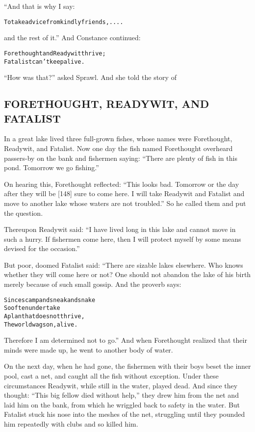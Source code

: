\documentclass{article}
\renewenvironment{verbatim}{\begin{alltt}\normalfont\begin{centering}}{\end{centering}\end{alltt}}
\begin{document}
“And that is why I say:

\begin{verbatim}
To take advice from kindly friends, ....
\end{verbatim}
and the rest of it.” And Constance continued:

\begin{verbatim}
Forethought and Ready wit thrive;
Fatalist can't keep alive.
\end{verbatim}
``How was that?'' asked Sprawl. And she told the story of

\subsection{FORETHOUGHT, READYWIT, AND FATALIST}

In a great lake lived three full-grown fishes, whose names were
Forethought, Readywit, and Fatalist. Now one day the fish named
Forethought overheard passers-by on the bank and fishermen saying:
``There are plenty of fish in this pond. Tomorrow we go fishing.''

On hearing this, Forethought reflected:
``This looks bad. Tomorrow or the day after they will be [148] sure to come here. I will take Readywit and Fatalist and move to another lake whose waters are not troubled.''
So he called them and put the question.

Thereupon Readywit said:
``I have lived long in this lake and cannot move in such a hurry. If fishermen come here, then I will protect myself by some means devised for the occasion.''

But poor, doomed Fatalist said: “There are sizable lakes elsewhere.
Who knows whether they will come here or not? One should not
abandon the lake of his birth merely because of such small gossip.
And the proverb says:

\begin{verbatim}
Since scamp and sneak and snake
So often undertake
A plan that does not thrive,
The world wags on, alive.
\end{verbatim}
Therefore I am determined not to go.” And when Forethought realized
that their minds were made up, he went to another body of water.

On the next day, when he had gone, the fishermen with their boys
beset the inner pool, cast a net, and caught all the fish without
exception. Under these circumstances Readywit, while still in the
water, played dead. And since they thought:
``This big fellow died without help,'' they drew him from the net
and laid him on the bank, from which he wriggled back to safety in
the water. But Fatalist stuck his nose into the meshes of the net,
struggling until they pounded him repeatedly with clubs and so
killed him.
\end{document}
